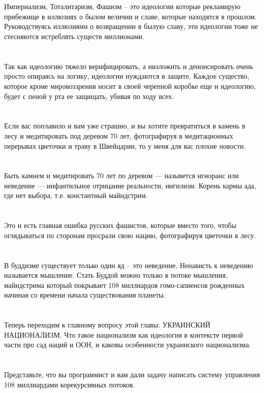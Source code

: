 \\
\\
Империализм, Тоталитаризм, Фашизм -- это идеологии которые рекламирую прибежище в иллюзиях о былом величии и славе, которые находятся в прошлом. Руководствуясь иллюзиями о возвращении в былую славу, эти идеологии тоже не стесняются истреблять существ миллионами.\\
\\
\\
Так как идеологию тяжело верифицировать, а низложить и денонсировать очень просто опираясь на логику, идеологии нуждаются в защите. Каждое существо, которое кроме мировоззрения носит в своей черепной коробке еще и идеологию, будет с пеной у рта ее защищать, убивая по ходу всех.\\
\\
\\
Если вас поплавило и вам уже страшно, и вы хотите превратиться в камень в лесу и медитировать под деревом 70 лет, фотографируя в медитационных перерывах цветочки и траву в Швейцарии, то у меня для вас плохие новости.\\
\\
\\
Быть камнем и медитировать 70 лет по деревом — назывется игноранс или неведение — инфантильное отрицание реальности, нигилизм. Корень кармы ада, где нет выбора, т.е. константный майндстрим.\\
\\
\\
Это и есть главная ошибка русских фашистов, которые вместо того, чтобы оглядываться по сторонам просрали свою нацию, фотографируя цветочки в лесу.\\
\\
\\
В буддизме существует только один яд -- это неведение. Ненависть к неведению называется мышление. Стать Буддой можно только в потоке мышления, майндстрима который покрывает 108 миллиардов гомо-сапиенсов рожденных начиная со времени начала существования планеты.\\
\\
\\
Теперь переходим к главному вопросу этой главы: УКРАИНСКИЙ НАЦИОНАЛИЗМ. Что такое национализм как идеология в контексте первой части про сад наций и ООН, и каковы особенности украинского национализма.\\
\\
\\
Представьте, что вы программист и вам дали задачу написать систему управления 108 миллиардами корекурсивных потоков.\\
